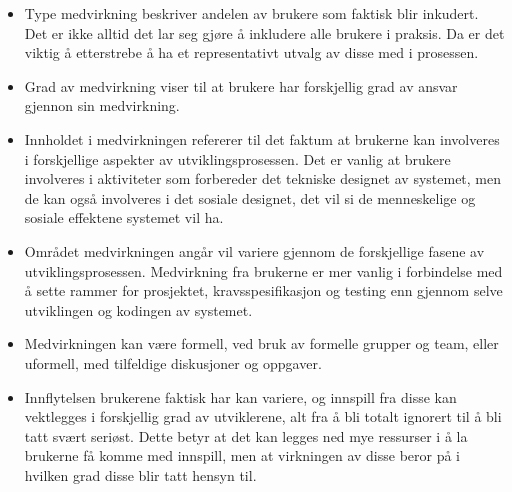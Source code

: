 \begin{itemize}
\item Type medvirkning beskriver andelen av brukere som faktisk blir inkudert. Det er ikke alltid det lar seg gjøre å inkludere alle brukere i praksis. Da er det viktig å etterstrebe å ha et representativt utvalg av disse med i prosessen.
\item Grad av medvirkning viser til at brukere har forskjellig grad av ansvar gjennon sin medvirkning.
\item Innholdet i medvirkningen refererer til det faktum at brukerne kan involveres i forskjellige aspekter av utviklingsprosessen. Det er vanlig at brukere involveres i aktiviteter som forbereder det tekniske designet av systemet, men de kan også involveres i det sosiale designet, det vil si de menneskelige og sosiale effektene systemet vil ha.
\item Området medvirkningen angår vil variere gjennom de forskjellige fasene av utviklingsprosessen. Medvirkning fra brukerne er mer vanlig i forbindelse med å sette rammer for prosjektet, kravsspesifikasjon og testing enn gjennom selve utviklingen og kodingen av systemet.
\item Medvirkningen kan være formell, ved bruk av formelle grupper og team, eller uformell, med tilfeldige diskusjoner og oppgaver.
\item Innflytelsen brukerene faktisk har kan variere, og innspill fra disse kan vektlegges i forskjellig grad av utviklerene, alt fra å bli totalt ignorert til å bli tatt svært seriøst. Dette betyr at det kan legges ned mye ressurser i å la brukerne få komme med innspill, men at virkningen av disse beror på i hvilken grad disse blir tatt hensyn til.
\end{itemize}

